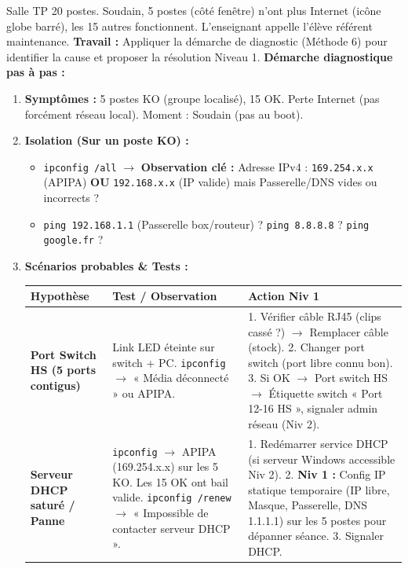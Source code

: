 \documentclass[11pt]{article}
\begin{document}
\begin{exoresolu}
Salle TP 20 postes. Soudain, 5 postes (côté fenêtre) n'ont plus Internet (icône globe barré), les 15 autres fonctionnent. L'enseignant appelle l'élève référent maintenance.
\textbf{Travail :} Appliquer la démarche de diagnostic (Méthode 6) pour identifier la cause et proposer la résolution Niveau 1.
\tcblower
\textbf{Démarche diagnostique pas à pas :}

\begin{enumerate}
    \item \textbf{Symptômes :} 5 postes KO (groupe localisé), 15 OK. Perte Internet (pas forcément réseau local). Moment : Soudain (pas au boot).
    \item \textbf{Isolation (Sur un poste KO) :}
          \begin{itemize}
              \item \texttt{ipconfig /all} $\rightarrow$ \textbf{Observation clé :} Adresse IPv4 : \texttt{169.254.x.x} (APIPA) \textbf{OU} \texttt{192.168.x.x} (IP valide) mais Passerelle/DNS vides ou incorrects ?
              \item \texttt{ping 192.168.1.1} (Passerelle box/routeur) ? \texttt{ping 8.8.8.8} ? \texttt{ping google.fr} ?
          \end{itemize}
    \item \textbf{Scénarios probables \& Tests :}
          \begin{tabularx}{\linewidth}{|l|X|X|}
          \hline
          \rowcolor{popblueL}
          \textbf{Hypothèse} & \textbf{Test / Observation} & \textbf{Action Niv 1} \\
          \hline
          \textbf{Port Switch HS (5 ports contigus)} & Link LED éteinte sur switch + PC. \texttt{ipconfig} $\rightarrow$ « Média déconnecté » ou APIPA. & 1. Vérifier câble RJ45 (clips cassé ?) $\rightarrow$ Remplacer câble (stock). 2. Changer port switch (port libre connu bon). 3. Si OK $\rightarrow$ Port switch HS $\rightarrow$ Étiquette switch « Port 12-16 HS », signaler admin réseau (Niv 2). \\
          \hline
          \textbf{Serveur DHCP saturé / Panne} & \texttt{ipconfig} $\rightarrow$ APIPA (169.254.x.x) sur les 5 KO. Les 15 OK ont bail valide. \texttt{ipconfig /renew} $\rightarrow$ « Impossible de contacter serveur DHCP ». & 1. Redémarrer service DHCP (si serveur Windows accessible Niv 2). 2. \textbf{Niv 1 :} Config IP statique temporaire (IP libre, Masque, Passerelle, DNS 1.1.1.1) sur les 5 postes pour dépanner séance. 3. Signaler DHCP. \\

\end{tabularx}
\end{enumerate}
\end{exoresolu}
\end{document}
